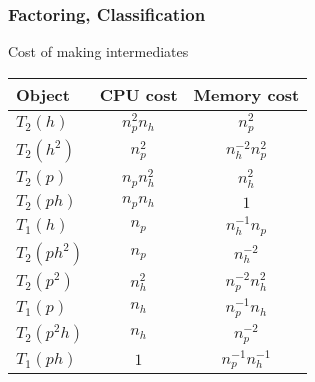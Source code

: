 \begin{frame}
    \frametitle{Factoring, Classification}

\begin{block}{\centering Cost of making intermediates}
\begin{center}
\begin{tabular}{|l||c|c|}
    \hline
    Object & CPU cost & Memory cost \\
    \hline
    $T_2(h)$ & $n_p^2 n_h$ & $ n_p^2$ \\
    \hline
    $T_2(h^2)$ & $n_p^2$ & $ n_h^{-2} n_p^2$ \\
    \hline
    $T_2(p)$ & $n_p n_h^2$ & $ n_h^2$ \\
    \hline
    $T_2(ph)$ & $n_p n_h$ & $1$ \\
    \hline
    $T_1(h)$ & $n_p$ & $ n_h^{-1} n_p$ \\
    \hline
    $T_2(ph^2)$ & $n_p$ & $ n_h^{-2}$ \\
    \hline
    $T_2(p^2)$ & $ n_h^2$ & $ n_p^{-2} n_h^2$ \\
    \hline
    $T_1(p)$ & $n_h$ & $ n_p^{-1} n_h$ \\
    \hline
    $T_2(p^2h)$ & $n_h$ & $ n_p^{-2}$ \\
    \hline
    $T_1(ph)$ & $1$ & $ n_p^{-1} n_h^{-1}$ \\
    \hline
\end{tabular}
\end{center}

\end{block}
\end{frame}

